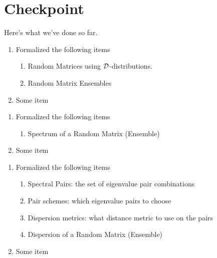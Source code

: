 

\newpage
\section{Checkpoint}

Here's what we've done so far.



\begin{enumerate}
  \item Formalized the following items
    \begin{enumerate}
      \item Random Matrices using $\mathcal{D}$-distributions.
      \item Random Matrix Ensembles
    \end{enumerate}
  \item Some item
\end{enumerate}


\begin{enumerate}
    \item Formalized the following items
      \begin{enumerate}
        \item Spectrum of a Random Matrix (Ensemble)
      \end{enumerate}
    \item Some item
\end{enumerate}


\begin{enumerate}
    \item Formalized the following items
      \begin{enumerate}
        \item Spectral Pairs: the set of eigenvalue pair combinations
        \item Pair schemes: which eigenvalue pairs to choose
        \item Dispersion metrics: what distance metric to use on the pairs
        \item Dispersion of a Random Matrix (Ensemble)
      \end{enumerate}
    \item Some item
\end{enumerate}

